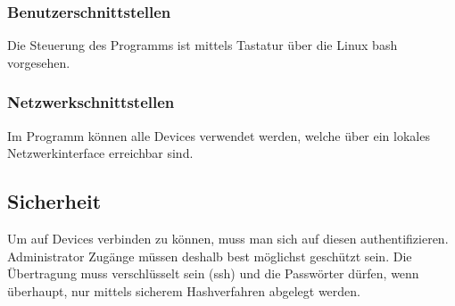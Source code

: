 \subsubsection{Benutzerschnittstellen}
Die Steuerung des Programms ist mittels Tastatur über die Linux bash vorgesehen.

\subsubsection{Netzwerkschnittstellen}
Im Programm können alle Devices verwendet werden, welche über ein lokales Netzwerkinterface erreichbar sind.

\subsection{Sicherheit}
Um auf Devices verbinden zu können, muss man sich auf diesen authentifizieren. Administrator Zugänge müssen deshalb best möglichst geschützt sein. Die Übertragung muss verschlüsselt sein (ssh) und die Passwörter dürfen, wenn überhaupt, nur mittels sicherem Hashverfahren abgelegt werden.